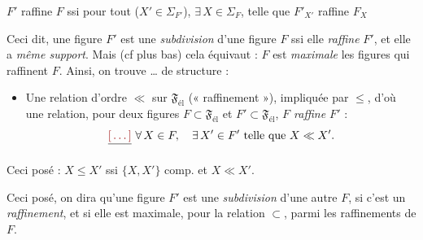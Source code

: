 \documentclass[11pt,a4paper]{article}
\begin{document}
$F'$ raffine $F$ ssi pour tout  ($X' \in \Sigma_{F'}$), $\exists\, X \in \Sigma_F$, telle que $F'_{X'}$ raffine $F_X$

Ceci dit, une figure $F'$ est une \emph{subdivision} d'une figure $F$ ssi elle \emph{raffine} $F'$, et  elle a \emph{même support}. Mais (cf plus bas) cela équivaut :  $F$ est \emph{maximale}   les figures qui raffinent $F$. \struck{\ill{}} Ainsi, on trouve \ldots{} \ill{} \ill{} de structure :

\begin{itemize}
  \item[(5)] Une relation d'ordre $\ll$ sur $\mathfrak{F}_{\mathrm{él}}$ (« raffinement »), impliquée par $\leq$, d'où une relation, pour deux figures $F \subset \mathfrak{F}_{\mathrm{él}}$ et $F' \subset \mathfrak{F}_{\mathrm{él}}$, \emph{$F$ raffine $F'$} :
  \[
    \struck{\ill{}}\ \forall\, X \in F, \quad \exists\, X' \in F' \text{ telle que } X \ll X'.
  \]
\end{itemize}

Ceci posé : $X \leq X'$ ssi   $\{X, X'\}$ comp. et $X \ll X'$.




Ceci posé, on dira qu'une figure $F'$ est une \emph{subdivision} d'une autre $F$, si c'est un \emph{raffinement}, et si elle est maximale, pour la relation $\subset$, parmi les raffinements de $F$.
\end{document}
